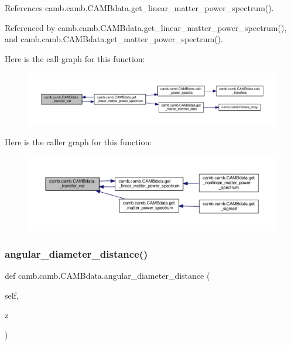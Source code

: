 References camb.\+camb.\+C\+A\+M\+Bdata.\+get\+\_\+linear\+\_\+matter\+\_\+power\+\_\+spectrum().



Referenced by camb.\+camb.\+C\+A\+M\+Bdata.\+get\+\_\+linear\+\_\+matter\+\_\+power\+\_\+spectrum(), and camb.\+camb.\+C\+A\+M\+Bdata.\+get\+\_\+matter\+\_\+power\+\_\+spectrum().

Here is the call graph for this function\+:
\nopagebreak
\begin{figure}[H]
\begin{center}
\leavevmode
\includegraphics[width=350pt]{classcamb_1_1camb_1_1CAMBdata_afe7429cb1e7bf51726bd2793648b42d7_cgraph}
\end{center}
\end{figure}
Here is the caller graph for this function\+:
\nopagebreak
\begin{figure}[H]
\begin{center}
\leavevmode
\includegraphics[width=350pt]{classcamb_1_1camb_1_1CAMBdata_afe7429cb1e7bf51726bd2793648b42d7_icgraph}
\end{center}
\end{figure}
\mbox{\label{classcamb_1_1camb_1_1CAMBdata_abbd4962602adc08e9ebecc753ac6f03d}} 
\subsubsection{\texorpdfstring{angular\+\_\+diameter\+\_\+distance()}{angular\_diameter\_distance()}}
{\footnotesize\ttfamily def camb.\+camb.\+C\+A\+M\+Bdata.\+angular\+\_\+diameter\+\_\+distance (\begin{DoxyParamCaption}\item[{}]{self,  }\item[{}]{z }\end{DoxyParamCaption})}

